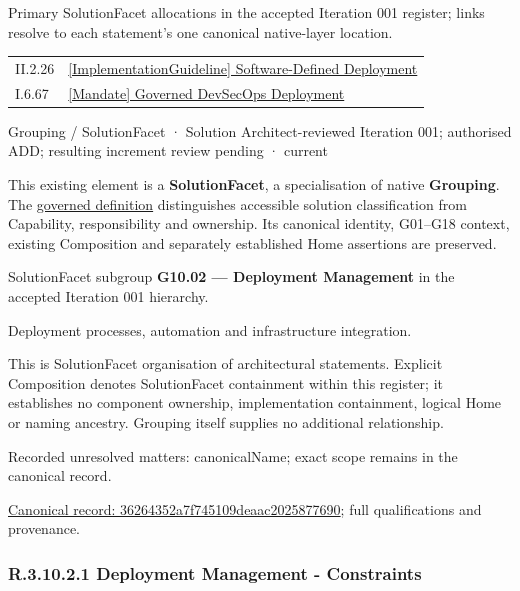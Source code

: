 Primary SolutionFacet allocations in the accepted Iteration 001 register; links resolve to each statement’s one canonical native-layer location.\par
\begin{longtable}{p{.22\linewidth}p{.73\linewidth}}
II.2.26 & \hyperref[element:1ad8342e9ffd43138b27be348e861a77]{[ImplementationGuideline] Software-Defined Deployment} \\
I.6.67 & \hyperref[element:54eb7e671c094ebcbb5503af36c7892d]{[Mandate] Governed DevSecOps Deployment} \\
\end{longtable}
\label{element:36264352a7f745109deaac2025877690}
{\small Grouping / SolutionFacet · Solution Architect-reviewed Iteration 001; authorised ADD; resulting increment review pending · current}\par

This existing element is a \textbf{SolutionFacet}, a specialisation of native
\textbf{Grouping}. The \href{\detokenize{../../../../../../../governance/continuum-representation.md#solutionfacet-classification--1119-candidate}}{governed definition}
distinguishes accessible solution classification from Capability, responsibility
and ownership. Its canonical identity, G01–G18 context, existing Composition
and separately established Home assertions are preserved.



SolutionFacet subgroup \textbf{G10.02 — Deployment Management} in the accepted Iteration 001 hierarchy.



Deployment processes, automation and infrastructure integration.



This is SolutionFacet organisation of architectural statements. Explicit Composition denotes SolutionFacet containment within this register; it establishes no component ownership, implementation containment, logical Home or naming ancestry. Grouping itself supplies no additional relationship.


{\small Recorded unresolved matters: canonicalName; exact scope remains in the canonical record.}\par
{\footnotesize \href{../../../../../../../continuum/grouping/36264352a7f745109deaac2025877690.md}{Canonical record: 36264352a7f745109deaac2025877690}; full qualifications and provenance.}\par
\subsubsection*{R.3.10.2.1 Deployment Management - Constraints}
\label{navigation:R.3.10.2.1}

